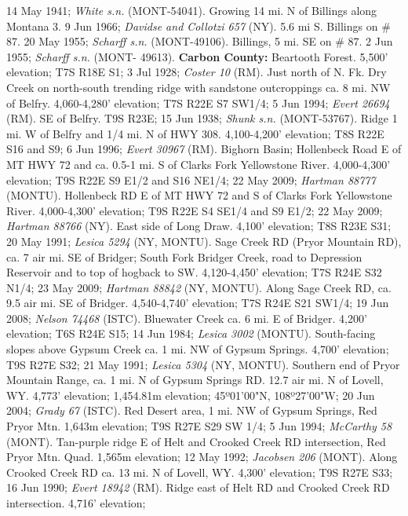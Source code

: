 14 May 1941; \textit{White s.n.} (MONT-54041).
Growing 14 mi. N of Billings along Montana 3. 9 Jun 1966;
\textit{Davidse and Collotzi 657} (NY).
5.6 mi S. Billings on \# 87. 20 May 1955; \textit{Scharff s.n.} (MONT-49106).
Billings, 5 mi. SE on \# 87. 2 Jun 1955; \textit{Scharff s.n.} (MONT- 49613).
  \textbf{Carbon County:}
Beartooth Forest. 5,500' elevation; T7S R18E S1; 3 Jul 1928;
\textit{Coster 10} (RM).
Just north of N. Fk. Dry Creek on north-south trending ridge with sandstone
outcroppings ca. 8 mi. NW of Belfry. 4,060-4,280' elevation; T7S R22E S7 SW1/4;
5 Jun 1994; \textit{Evert 26694} (RM).
SE of Belfry. T9S R23E; 15 Jun 1938; \textit{Shunk s.n.} (MONT-53767).
Ridge 1 mi. W of Belfry and 1/4 mi. N of HWY 308. 4,100-4,200' elevation;
T8S R22E S16 and S9; 6 Jun 1996; \textit{Evert 30967} (RM).
Bighorn Basin; Hollenbeck Road E of MT HWY 72 and ca. 0.5-1 mi. S of Clarks
Fork Yellowstone River. 4,000-4,300' elevation; T9S R22E S9 E1/2 and S16 NE1/4;
22 May 2009; \textit{Hartman 88777} (MONTU).
Hollenbeck RD E of MT HWY 72 and S of Clarks Fork Yellowstone River.
4,000-4,300' elevation; T9S R22E S4 SE1/4 and S9 E1/2; 22 May 2009;
\textit{Hartman 88766} (NY).
East side of Long Draw. 4,100' elevation; T8S R23E S31; 20 May 1991;
\textit{Lesica 5294} (NY, MONTU).
Sage Creek RD (Pryor Mountain RD), ca. 7 air mi. SE of Bridger; South Fork
Bridger Creek, road to Depression Reservoir and to top of hogback to SW.
4,120-4,450' elevation; T7S R24E S32 N1/4; 23 May 2009;
\textit{Hartman 88842} (NY, MONTU).
Along Sage Creek RD, ca. 9.5 air mi. SE of Bridger. 4,540-4,740' elevation;
T7S R24E S21 SW1/4; 19 Jun 2008; \textit{Nelson 74468} (ISTC).
Bluewater Creek ca. 6 mi. E of Bridger. 4,200' elevation; T6S R24E S15;
14 Jun 1984; \textit{Lesica 3002} (MONTU).
South-facing slopes above Gypsum Creek ca. 1 mi. NW of Gypsum Springs.
4,700' elevation; T9S R27E S32; 21 May 1991; \textit{Lesica 5304} (NY, MONTU).
Southern end of Pryor Mountain Range, ca. 1 mi. N of Gypsum Springs RD. 12.7 air
mi. N of Lovell, WY. 4,773' elevation; 1,454.81m elevation;
45º01'00"N, 108º27'00"W; 20 Jun 2004; \textit{Grady 67} (ISTC).
Red Desert area, 1 mi. NW of Gypsum Springs, Red Pryor Mtn. 1,643m elevation;
T9S R27E S29 SW 1/4; 5 Jun 1994; \textit{McCarthy 58} (MONT).
Tan-purple ridge E of Helt and Crooked Creek RD intersection, Red Pryor Mtn.
Quad. 1,565m elevation; 12 May 1992; \textit{Jacobsen 206} (MONT).
Along Crooked Creek RD ca. 13 mi. N of Lovell, WY. 4,300' elevation;
T9S R27E S33; 16 Jun 1990; \textit{Evert 18942} (RM).
Ridge east of Helt RD and Crooked Creek RD intersection. 4,716' elevation;
